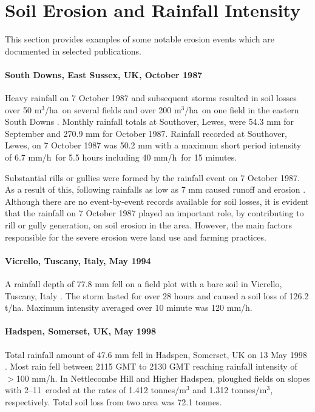 \section{Soil Erosion and Rainfall Intensity}
\label{sec:RainfallIntensityAndSoilErosion}

This section provides examples of some notable erosion events which are
documented in selected publications.

\paragraph{South Downs, East Sussex, UK, October 1987
\citep{boardman1988-333}}
\label{sec:SouthDownsOctober1987}

Heavy rainfall on 7 October 1987 and subsequent storms resulted in soil losses
over 50 m$^3$/ha\ on several fields and over 200 m$^3$/ha\ on one field in the
eastern South Downs \citep{boardman1988-333}. Monthly rainfall totals at
Southover, Lewes, were 54.3 mm for September and 270.9 mm for October 1987.
Rainfall recorded at Southover, Lewes, on 7 October 1987 was 50.2 mm with a
maximum short period intensity of 6.7 mm/h\ for 5.5 hours including 40 mm/h\ for
15 minutes.

Substantial rills or gullies were formed by the rainfall event on 7 October
1987. As a result of this, following rainfalls as low as 7 mm caused runoff and
erosion \citep{boardman1988-333}.
Although there are no event-by-event records available for soil losses, it is
evident that the rainfall on 7 October 1987 played an important role, by
contributing to rill or gully generation, on  soil erosion in the area. However,
the main factors responsible for the severe erosion were land use and farming
practices.

\paragraph{Vicrello, Tuscany, Italy, May 1994 \citep{torri1999-131}}
\label{sec:VicrelloVolterraTuscany}

A rainfall depth of 77.8 mm fell on a field plot with a bare soil in Vicrello,
Tuscany, Italy \citep{torri1999-131}. The storm lasted for over 28 hours and
caused a soil loss of 126.2 t/ha. Maximum intensity averaged over 10 minute was
120 mm/h.

\paragraph{Hadspen, Somerset, UK, May 1998 \citep{clark2000-17}}
\label{sec:HadspenSomersetUK}
Total rainfall amount of 47.6 mm fell in Hadspen, Somerset, UK on 13 May 1998
\citep{clark2000-17}. Most rain fell between 2115 GMT to 2130 GMT reaching
rainfall intensity of $>$100 mm/h. In Nettlecombe Hill and Higher Hadspen,
ploughed fields on slopes with 2--11\textdegree\ eroded at the rates of 1.412
tonnes/m$^3$ and 1.312 tonnes/m$^3$, respectively. Total soil loss from two area
was 72.1 tonnes.

